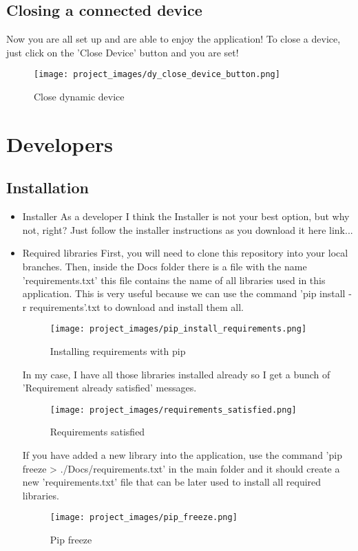 	\subsection{Closing a connected device}
	Now you are all set up and are able to enjoy the application! To close a device, just click on the 'Close Device' button and you are set!

	\begin{figure}[H]
	\centering
	\texttt{[image: project\_images/dy\_close\_device\_button.png]}
	 \caption{Close dynamic device}
	 \label{fig:close dynamic device}
	\end{figure}
	

\newpage
\section{Developers}
\subsection{Installation}
\begin{itemize}
\item Installer
\newline As a developer I think the Installer is not your best option, but why not, right? Just follow the installer instructions as you download it here link...
\item Required libraries
\newline First, you will need to clone this repository into your local branches. Then, inside the Docs folder there is a file with the name 'requirements.txt' this file contains the name of all libraries used in this application. This is very useful because we can use the command 'pip install -r requirements'.txt to download and install them all.

\begin{figure}[H]
\centering
\texttt{[image: project\_images/pip\_install\_requirements.png]}
 \caption{Installing requirements with pip}
 \label{fig:pip install requirements}
\end{figure}

In my case, I have all those libraries installed already so I get a bunch of 'Requirement already satisfied' messages.

\begin{figure}[H]
\centering
\texttt{[image: project\_images/requirements\_satisfied.png]}
 \caption{Requirements satisfied}
 \label{fig:requirements satisfied}
\end{figure}

If you have added a new library into the application, use the command 'pip freeze > ./Docs/requirements.txt' in the main folder and it should create a new 'requirements.txt' file that can be later used to install all required libraries.

\begin{figure}[H]
\centering
\texttt{[image: project\_images/pip\_freeze.png]}
 \caption{Pip freeze}
 \label{fig:pip freeze}
\end{figure}	
\end{itemize}


